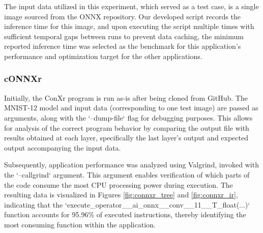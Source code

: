 \documentclass[fleqn,10pt]{olplainarticle}
\begin{document}
The input data utilized in this experiment, which served as a test case, is a single image sourced from the ONNX repository. Our developed script records the inference time for this image, and upon executing the script multiple times with sufficient temporal gaps between runs to prevent data caching, the minimum reported inference time was selected as the benchmark for this application's performance and optimization target for the other applications.

\subsubsection{cONNXr}
Initially, the ConXr program is run as-is after being cloned from GitHub. The MNIST-12 model and input data (corresponding to one test image) are passed as arguments, along with the `--dump-file` flag for debugging purposes. This allows for analysis of the correct program behavior by comparing the output file with results obtained at each layer, specifically the last layer's output and expected output accompanying the input data.

Subsequently, application performance was analyzed using Valgrind, invoked with the `--callgrind` argument. This argument enables verification of which parts of the code consume the most CPU processing power during execution. The resulting data is visualized in Figures \ref{fig:connxr_tree} and \ref{fig:connxr_ir}, indicating that the `execute\_operator\_\_ai\_onnx\_\_conv\_\_11\_\_T\_float(...)` function accounts for 95.96\% of executed instructions, thereby identifying the most consuming function within the application.
\end{document}
